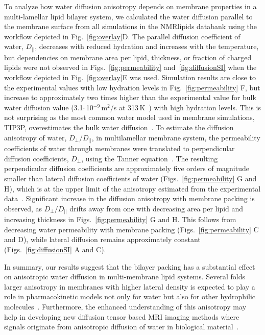 \documentclass[fleqn,10pt]{wlscirep}
\begin{document}
To analyze how water diffusion anisotropy depends on membrane properties in a multi-lamellar lipid bilayer system, we calculated the water diffusion parallel to the membrane surface from all simulations in the NMRlipids databank using the workflow depicted in Fig.~\ref{fig:overlay}D. The parallel diffusion coefficient of water, $D_{||}$, decreases with reduced hydration and increases with the temperature, but dependencies on membrane area per lipid, thickness, or fraction of charged lipids were not observed in Figs.~\ref{fig:permeability} and~\ref{fig:diffusionSI} when the workflow depicted in Fig.~\ref{fig:overlay}E was used. Simulation results are close to the experimental values with low hydration levels in Fig.~\ref{fig:permeability} F, but increase to approximately two times higher than the experimental value for bulk water diffusion value (3.1$\cdot$\,10$^{-9}$\,m$^2$/s at 313\,K~\cite{khakimov08}) with high hydration levels. This is not surprising as the most common water model used in membrane simulations, TIP3P, overestimates the bulk water diffusion~\cite{pathirannahalage21}. To estimate the diffusion anisotropy of water, $D_\mathrm{\perp}/D_{||}$, in multilamellar membrane system, the permeability coefficients of water through membranes were translated to perpendicular diffusion coefficients, $D_\mathrm{\perp}$, using the Tanner equation~\cite{tanner78,wasterby02}. The resulting perpendicular diffusion coefficients are approximately five orders of magnitude smaller than lateral diffusion coefficients of water (Figs.~\ref{fig:permeability} G and H), which is at the upper limit of the anisotropy estimated from the experimental data~\cite{nitsche19}. Significant increase in the diffusion anisotropy with membrane packing is observed, as $D_\mathrm{\perp}/D_{||}$ drifts away from one with decreasing area per lipid and increasing thickness in Figs.~\ref{fig:permeability} G and H. This follows from decreasing water permeability with membrane packing (Figs.~\ref{fig:permeability} C and D), while lateral diffusion remains approximately constant (Figs.~\ref{fig:diffusionSI} A and C). 

In summary, our results suggest that the bilayer packing has a substantial effect on anisotropic water diffusion in multi-membrane lipid systems. Several folds larger anisotropy in membranes with higher lateral density is expected to play a role in pharmacokinetic models not only for water but also for other hydrophilic molecules~\cite{nitsche19}. Furthermore, the enhanced understanding of this anisotropy may help in developing new diffusion tensor based MRI imaging methods where signals originate from anisotropic diffusion of water in biological material~\cite{topgaard20}.
\end{document}
